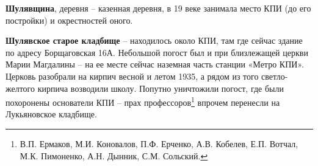 
\medskip

\textbf{Шулявщина}, деревня – казенная деревня, в 19 веке занимала место КПИ (до его постройки) и окрестностей оного.\\

\medskip


\textbf{Шулявское старое кладбище} – находилось около КПИ, там где сейчас здание по адресу Борщаговская 16А. Небольшой погост был и при близлежащей церкви Марии Магдалины – на ее месте сейчас наземная часть станции «Метро КПИ». Церковь разобрали на кирпич весной и летом 1935, а рядом из того светло-желтого кирпича возводили школу. Попутно уничтожили погост, где были похоронены основатели КПИ – прах профессоров\footnote{В.П. Ермаков, М.И. Коновалов, П.Ф. Ерченко, А.В. Кобелев, Е.П. Вотчал, М.К. Пимоненко, А.Н. Дынник, С.М. Сольский.} впрочем перенесли на Лукьяновское кладбище.


